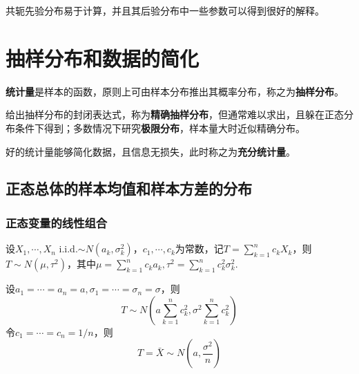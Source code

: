 \documentclass{ctexbook}
\begin{document}
共轭先验分布易于计算，并且其后验分布中一些参数可以得到很好的解释。

\chapter{抽样分布和数据的简化}

\begin{definition}
    \textbf{统计量}是样本的函数，原则上可由样本分布推出其概率分布，称之为\textbf{抽样分布}。
\end{definition}

给出抽样分布的封闭表达式，称为\textbf{精确抽样分布}，但通常难以求出，且躲在正态分布条件下得到；多数情况下研究\textbf{极限分布}，样本量大时近似精确分布。

好的统计量能够简化数据，且信息无损失，此时称之为\textbf{充分统计量}。

\section{正态总体的样本均值和样本方差的分布}

\subsection{正态变量的线性组合}

\begin{theorem}
    设$X_1,\cdots,X_n$ i.i.d.$\sim N(a_k,\sigma_k^2)$，$c_1,\cdots,c_k$为常数，记$T=\sum_{k=1}^n c_k X_k$，则$T\sim N(\mu,\tau^2)$，其中$\mu=\sum_{k=1}^n c_k a_k,\tau^2=\sum_{k=1}^n c_k^2 \sigma^2_k$.
\end{theorem}

\begin{corollary}
    设$a_1=\cdots=a_n=a,\sigma_1=\cdots=\sigma_n=\sigma$，则
    $$T\sim N\left(a\sum_{k=1}^n c_k^2,\sigma^2\sum_{k=1}^n c_k^2\right)$$
    令$c_1=\cdots=c_n=1/n$，则
    $$T=\bar{X}\sim N\left(a,\frac{\sigma^2}{n}\right)$$
\end{corollary}
\end{document}
